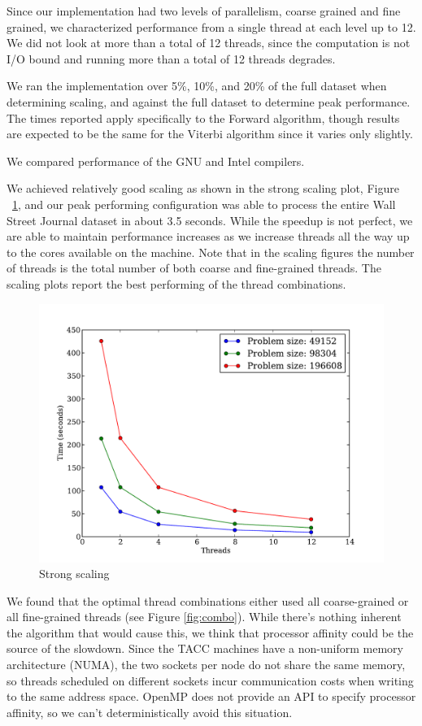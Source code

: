 \documentclass[11pt,onecolumn]{article}
\begin{document}

Since our implementation had two levels of parallelism, coarse grained and fine grained, we characterized performance from a single thread at each level up to 12. We did not look at more than a total of 12 threads, since the computation is not I/O bound and running more than a total of 12 threads degrades.

We ran the implementation over 5\%, 10\%, and 20\% of the full dataset when determining scaling, and against the full dataset to determine peak performance. The times reported apply specifically to the Forward algorithm, though results are expected to be the same for the Viterbi algorithm since it varies only slightly.

We compared performance of the GNU and Intel compilers.


We achieved relatively good scaling as shown in the strong scaling plot, Figure ~\ref{fig:strong_scaling}, and our peak performing configuration was able to process the entire Wall Street Journal dataset in about 3.5 seconds. While the speedup is not perfect, we are able to maintain performance increases as we increase threads all the way up to the cores available on the machine. Note that in the scaling figures the number of threads is the total number of both coarse and fine-grained threads. The scaling plots report the best performing of the thread combinations.

\begin{figure}[h!]
\centering
\includegraphics[width=.75\linewidth]{figures/intel_strong_scaling}
\caption{Strong scaling}
\label{fig:strong_scaling}
\end{figure}

We found that the optimal thread combinations either used all coarse-grained or all fine-grained threads (see Figure \ref{fig:combo}). While there's nothing inherent the algorithm that would cause this, we think that processor affinity could be the source of the slowdown. Since the TACC machines have a non-uniform memory architecture (NUMA), the two sockets per node do not share the same memory, so threads scheduled on different sockets incur communication costs when writing to the same address space. OpenMP does not provide an API to specify processor affinity, so we can't deterministically avoid this situation.
\end{document}
